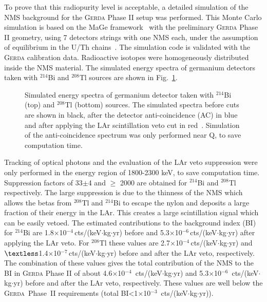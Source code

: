 \documentclass[twocolumn,epjc3]{svjour3}
\newcommand{\ctsper} {{cts/(keV\(\cdot\)kg\(\cdot\)yr)}}
\newcommand{\Gerda} {{\textsc{Gerda}\xspace}}
\newcommand{\I}[2]{$^{#1}$#2}
\newcommand{\tsb}{\textsubscript}
\begin{document}
To prove that this radiopurity level is acceptable, a detailed simulation of the NMS background for the \Gerda{} Phase II setup was performed. This Monte Carlo simulation is based on the MaGe framework~\cite{MAGE} with the preliminary \Gerda{} Phase II geometry, using 7 detectors strings with one NMS each, under the assumption of equilibrium in the U/Th chains~\cite{phd_bjoern}. The simulation code is validated with the \Gerda{} calibration data. Radioactive isotopes were homogeneously distributed inside the NMS material. The simulated energy spectra of germanium detectors taken with \I{214}{Bi} and \I{208}{Tl} sources are shown in Fig.~\ref{fig:sim_spectrum}.
%
\begin{figure}
  \begin{minipage}{1\linewidth}
  \end{minipage}
  \hfill
  \begin{minipage}{1\linewidth}
  \end{minipage}
  \caption{\label{fig:sim_spectrum}Simulated energy spectra of germanium detector taken with \I{214}{Bi} (top) and \I{208}{Tl} (bottom) sources. The simulated spectra before cuts are shown in black, after the detector anti-coincidence (AC) in blue and after applying the LAr scintillation veto cut in red~\cite{phd_bjoern}. Simulation of the anti-coincidence spectrum was only performed near Q\tsb{\textbeta\textbeta}, to save computation time. }
\end{figure}
%
Tracking of optical photons and the evaluation of the LAr veto suppression were only performed in the energy region of 1800-2300 keV, to save computation time. Suppression factors of 33$\pm$4 and $\ge$ 2000 are obtained for \I{214}{Bi} and \I{208}{Tl} respectively. The large suppression is due to the thinness of the NMS which allows the betas from \I{208}{Tl} and \I{214}{Bi} to escape the nylon and deposits a large fraction of their energy in the LAr. This creates a large scintillation signal which can be easily vetoed. The estimated contributions to the background index (BI) for \I{214}{Bi} are 1.8$\times$10$^{-4}$\,\ctsper{} before and 5.3$\times$10$^{-6}$\,\ctsper{} after applying the LAr veto. For \I{208}{Tl} these values are 2.7$\times$10$^{-4}$\,\ctsper{} and $\textless$1.4$\times$10$^{-7}$\,\ctsper{} before and after the LAr veto, respectively. The combination of these values gives the total contribution of the NMS to the BI in \Gerda{} Phase II of about 4.6$\times$10$^{-4}$\, \ctsper{} and 5.3$\times$10$^{-6}$\, \ctsper{} before and after the LAr veto, respectively. These values are well below the \Gerda{}~Phase~II requirements (total BI\textless 1$\times$10$^{-3}$\, \ctsper{}).
%
\end{document}
